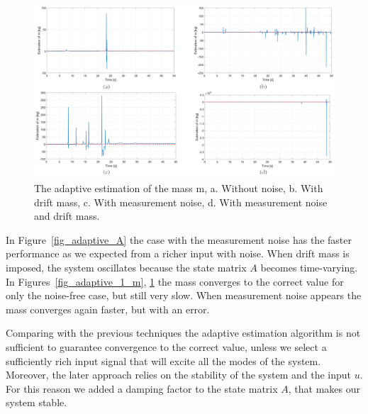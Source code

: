 \documentclass[12pt]{article}
\begin{document}
\begin{figure}[!h]
	\includegraphics[width=.95\columnwidth]{figures/adaptive_m.png}
	\centering
	\caption{The adaptive estimation of the mass m, a. Without noise, b. With drift mass, c. With measurement noise, d. With measurement noise and drift mass.}
	\label{fig_adaptive_m}
\end{figure}

In Figure~\ref{fig_adaptive_A} the case with the measurement noise has the faster performance as we expected from a richer input with noise. When drift mass is imposed, the system oscillates because the state matrix $A$ becomes time-varying. In Figures~\ref{fig_adaptive_1_m}, \ref{fig_adaptive_m} the mass converges to the correct value for only the noise-free case, but still very slow. When measurement noise appears the mass converges again faster, but with an error. 

Comparing with the previous techniques the adaptive estimation algorithm is not sufficient to guarantee convergence to the correct value, unless we select a sufficiently rich input signal that will excite all the modes of the system. Moreover, the later approach relies on the stability of the system and the input $u$. For this reason we added a damping factor to the state matrix $A$, that makes our system stable.
\end{document}
